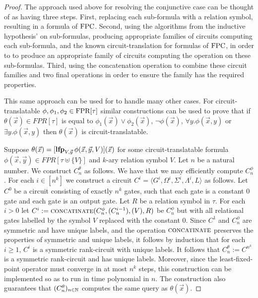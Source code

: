 \documentclass[../paper.tex]{subfiles}
\begin{document}
\begin{proof}
  The approach used above for resolving the conjunctive case can be thought of
  as having three steps. First, replacing each sub-formula with a relation
  symbol, resulting in a formula of $\text{\upshape FPC}$. Second, using the algorithms from
  the inductive hypothesis' on sub-formulas, producing appropriate families of
  circuits computing each sub-formula, and the known circuit-translation for
  formulas of $\text{\upshape FPC}$, in order to to produce an appropriate family of circuits
  computing the operation on these sub-formulas. Third, using the concatenation
  operation to combine these circuit families and two final operations in order
  to ensure the family has the required properties.
  
  This same approach can be used for to handle many other cases. For
  circuit-translatable $\phi, \phi_1, \phi_2 \in \text{\upshape FPR}[\tau]$ similar
  constructions can be used to prove that if $\theta(\vec{x}) \in FPR[\tau]$ is
  equal to $\phi_1(\vec{x}) \lor \phi_2(\vec{x})$, $\neg \phi(\vec{x})$,
  $\forall y. \phi (\vec{x}, y)$ or $\exists y. \phi (\vec{x}, y)$ then
  $\theta(\vec{x})$ is circuit-translatable.

  Suppose $\theta(\vec{x}) = [\text{\textbf{lfp}}_{V, \vec{y}} \, \phi(\vec{x}, \vec{y},
    V) ](\vec{x})$ for some circuit-translatable formula $\phi(\vec{x},
  \vec{y}) \in FPR[\tau \uplus \{V\}]$ and $k$-ary relation symbol $V$. Let $n$
  be a natural number. We construct $C^{\theta}_n$ as follows. We have that we
  may efficiently compute $C^{\phi}_n$. For each $i \in [n^k]$ we construct a
  circuit $C^i = \langle G^i, \Omega^i, \Sigma^i, \Lambda^i, L \rangle $ as
  follows. Let $C^0$ be a circuit consisting of exactly $n^k$ gates, such that
  each gate is a constant $0$ gate and each gate is an output gate. Let $R$ be a
  relation symbol in $\tau$. For each $i > 0$ let $C^i :=
  {\normalfont\textsc{concatinate}}(C^{\phi}_n, (C^{i-1}_n), (V), R)$ be $C^{\phi}_n$ but with
  all relational gates labelled by the symbol $V$ replaced with the constant
  $0$. Since $C^1$ and $C^\phi_n$ are symmetric and have unique labels, and the
  operation ${\normalfont\textsc{concatinate}}$ preserves the properties of symmetric and unique
  labels, it follows by induction that for each $i \geq 1$, $C^i$ is a symmetric
  rank-circuit with unique labels. It follows that $C^{\theta}_n := C^{n^k}$ is
  a symmetric rank-circuit and has unique labels. Moreover, since the
  least-fixed-point operator must converge in at most $n^k$ steps, this
  construction can be implemented so as to run in time polynomial in $n$. The
  construction also guarantees that $(C^{\theta}_n)_{n \in \mathbb{N}}$ computes the
  same query as $\theta(\vec{x})$.


\end{proof}
\end{document}
